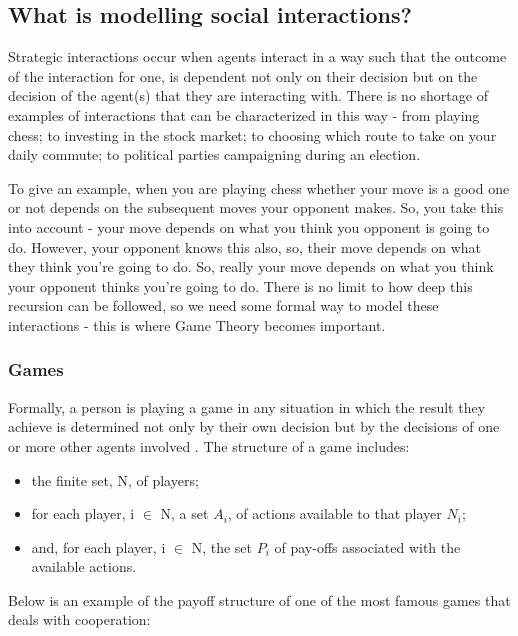 \documentclass[11pt]{article}
\newcommand*{\np}{\par\noindent\newline}
\begin{document}
\subsection{What is modelling social interactions?}\label{modelling_social_interactions}
Strategic interactions occur when agents interact in a way such that the
outcome of the interaction for one, is dependent not only on their decision
but on the decision of the agent(s) that they are interacting with. There is no
shortage of examples of interactions that can be characterized in this way -
from playing chess; to investing in the stock market; to choosing which route
to take on your daily commute; to political parties campaigning during an
election.
\np To give an example, when you are playing chess whether your move is a good
one or not depends on the subsequent moves your opponent makes. So, you take
this into account - your move depends on what you think you opponent is going
to do. However, your opponent knows this also, so, their move depends on what
they think you're going to do. So, really your move depends on what you think
your opponent thinks you're going to do. There is no limit to how deep this
recursion can be followed, so we need some formal way to model these
interactions - this is where Game Theory becomes important.
\subsubsection{Games}
Formally, a person is playing a game in any situation in which the result they
achieve is determined not only by their own decision but by the decisions of
one or more other agents involved \cite{angner_course_2012}. The structure of a game includes:
\begin{itemize}
	\item the finite set, N, of players;
	\item for each player, i $\in$ N, a set $A_i$, of actions available to that
	player $N_i$;
	\item and, for each player, i $\in$ N, the set $P_i$ of pay-offs associated
	with the available actions.
\end{itemize}
\cite{osborne_course_1994}
\np Below is an example of the payoff structure of one of the most famous games
that deals with cooperation: 
\end{document}
